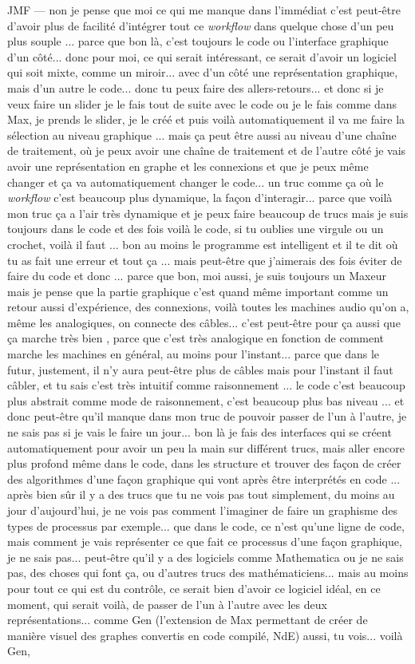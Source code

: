 JMF — non je pense que moi ce qui me manque dans l'immédiat c'est peut-être d'avoir plus de facilité d'intégrer tout ce \textit{workflow} dans quelque chose d'un peu plus souple ... parce que bon là, c'est toujours le code ou l'interface graphique d'un côté... donc pour moi, ce qui serait intéressant, ce serait d'avoir un logiciel qui soit mixte, comme un miroir... avec d'un côté une représentation graphique, mais d'un autre le code... donc tu peux faire des allers-retours... et donc si je veux faire un slider je le fais tout de suite avec le code ou je le fais comme dans Max, je prends le slider, je le créé et puis voilà automatiquement il va me faire la sélection au niveau graphique ... mais ça peut être aussi au niveau d'une chaîne de traitement, où je peux avoir une chaîne de traitement et de l'autre côté je vais avoir une représentation en graphe et les connexions et que je peux même changer et ça va automatiquement changer le code... un truc comme ça où le \textit{workflow} c'est beaucoup plus dynamique, la façon d'interagir... parce que voilà mon truc ça a l'air très dynamique et je peux faire beaucoup de trucs mais je suis toujours dans le code et des fois voilà le code, si tu oublies une virgule ou un crochet, voilà il faut ... bon au moins le programme est intelligent et il te dit où tu as fait une erreur et tout ça ... mais peut-être que j'aimerais des fois éviter de faire du code et donc ... parce que bon, moi aussi, je suis toujours un Maxeur mais je pense que la partie graphique c'est quand même important comme un retour aussi d'expérience, des connexions, voilà toutes les machines audio qu'on a, même les analogiques, on connecte des câbles... c'est peut-être pour ça aussi que ça marche très bien , parce que c'est très analogique en fonction de comment marche les machines en général, au moins pour l'instant... parce que dans le futur, justement, il n'y aura peut-être plus de câbles mais pour l'instant il faut câbler, et tu sais c'est très intuitif comme raisonnement ... le code c'est beaucoup plus abstrait comme mode de raisonnement, c'est beaucoup plus bas niveau ... et donc peut-être qu'il manque dans mon truc de pouvoir passer de l'un à l'autre, je ne sais pas si je vais le faire un jour... bon là je fais des interfaces qui se créent automatiquement pour avoir un peu la main sur différent trucs, mais aller encore plus profond même dans le code, dans les structure et trouver des façon de créer des algorithmes d'une façon graphique qui vont après être interprétés en code ... après bien sûr il y a des trucs que tu ne vois pas tout simplement, du moins au jour d'aujourd'hui, je ne vois pas comment l'imaginer de faire un graphisme des types de processus par exemple... que dans le code, ce n'est qu'une ligne de code, mais comment je vais représenter ce que fait ce processus d'une façon graphique, je ne sais pas... peut-être qu'il y a des logiciels comme Mathematica ou je ne sais pas, des choses qui font ça, ou d'autres trucs des mathématiciens... mais au moins pour tout ce qui est du contrôle, ce serait bien d'avoir ce logiciel idéal, en ce moment, qui serait voilà, de passer de l'un à l'autre avec les deux représentations... comme Gen (l'extension de Max permettant de créer de manière visuel des graphes convertis en code compilé, NdE) aussi, tu vois... voilà Gen, 